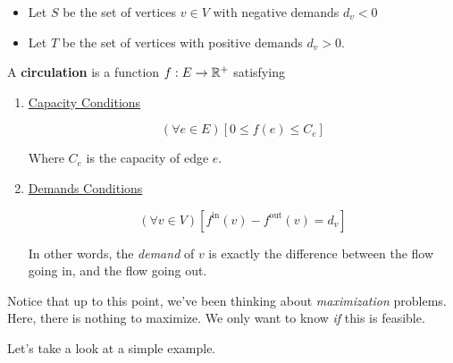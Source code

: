 \documentclass[12pt]{article}
\begin{document}

    \begin{itemize}
      \item Let $S$ be the set of vertices $v \in V$ with negative demands $d_v < 0$
      \item Let $T$ be the set of vertices with positive demands $d_v > 0$.
    \end{itemize}

     {
      A {\bf circulation} is a function $f: E \to {\mathbb R}^+$ satisfying

      \begin{enumerate}
        \item \underline{Capacity Conditions}

          \[
            (\forall e \in E) [0 \le f(e) \le C_e]
          \]

          Where $C_e$ is the capacity of edge $e$.

        \item \underline{Demands Conditions}

          \[
            (\forall v \in V)[f^\text{in}(v) - f^\text{out}(v) = d_v]
          \]

          In other words, the {\it demand} of $v$ is exactly the difference
          between the flow going in, and the flow going out.
      \end{enumerate}
    }

    Notice that up to this point, we've been thinking about {\it maximization}
    problems. Here, there is nothing to maximize. We only want to know {\it if}
    this is feasible.

    Let's take a look at a simple example.
\end{document}
